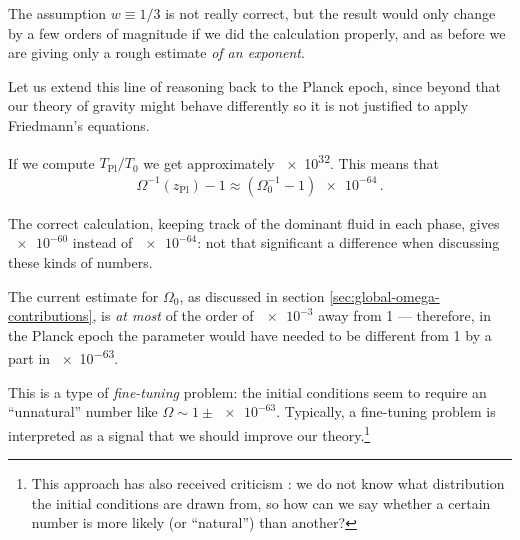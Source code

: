 \documentclass[main.tex]{subfiles}
\begin{document}
The assumption \(w \equiv 1/3\) is not really correct, but the result would only change by a few orders of magnitude if we did the calculation properly, and as before we are giving only a rough estimate \emph{of an exponent}.

Let us extend this line of reasoning back to the Planck epoch, since beyond that our theory of gravity might behave differently so it is not justified to apply Friedmann's equations. 

If we compute \(T _{\text{Pl}} / T_0 \) we get approximately \num{e32}.
This means that 
%
\begin{align}
\Omega^{-1}(z_{\text{Pl}}) - 1 \approx (\Omega_0^{-1} - 1) \num{e-64}
\,.
\end{align}

The correct calculation, keeping track of the dominant fluid in each phase, gives \(\num{e-60}\) instead of \(\num{e-64}\): not that significant a difference when discussing these kinds of numbers.

The current estimate for \(\Omega_0 \), as discussed in section \ref{sec:global-omega-contributions}, is \emph{at most} of the order of \(\num{e-3}\) away from 1 --- therefore, in the Planck epoch the parameter would have needed to be different from 1 by a part in \num{e-63}. 

This is a type of \emph{fine-tuning} problem: the initial conditions seem to require an ``unnatural'' number like \(\Omega \sim 1 \pm \num{e-63}\).
Typically, a fine-tuning problem is interpreted as a signal that we should improve our theory.\footnote{This approach has also received criticism \cite[sec.\ 3.2]{hossenfelderScreamsExplanationFinetuning2019}: we do not know what distribution the initial conditions are drawn from, so how can we say whether a certain number is more likely (or ``natural'') than another?}
\end{document}
